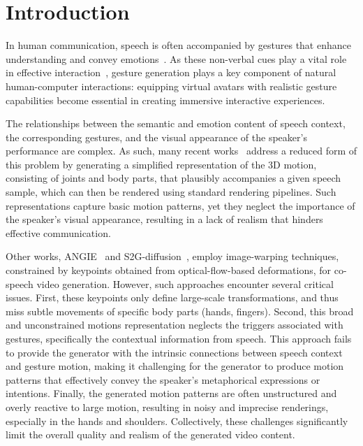 \section{Introduction}
\label{sec:introduction}
  \vspace{-0.1cm}

In human communication, speech is often accompanied by gestures that enhance understanding and convey emotions~\cite{de2012interplay}. As these non-verbal cues play a vital role in effective interaction~\cite{burgoon1990nonverbal}, gesture generation plays a key component of natural human-computer interactions: equipping virtual avatars with realistic gesture capabilities become essential in creating immersive interactive experiences.

The relationships between the semantic and emotion content of speech context, the corresponding gestures, and the visual appearance of the speaker's performance are complex. As such, many recent works~\cite{yi2022generating, liu2023emage, liu2022learning, liu2022disco} address a reduced form of this problem by generating a simplified representation of the 3D motion, consisting of joints and body parts, that plausibly accompanies a given speech sample, which can then be rendered using standard rendering pipelines. Such representations capture basic motion patterns, yet they neglect the importance of the speaker's visual appearance, resulting in a lack of realism that hinders effective communication.

Other works, \eg ANGIE~\cite{angie} and S2G-diffusion~\cite{s2gdiffusion}, employ image-warping techniques, constrained by keypoints obtained from optical-flow-based deformations, for co-speech video generation.
However, such approaches encounter several critical issues.
First, these keypoints only define large-scale transformations, and thus miss subtle movements of specific body parts (\eg hands, fingers).
Second, this broad and unconstrained motions representation neglects the triggers associated with gestures, specifically the contextual information from speech. This approach fails to provide the generator with the intrinsic connections between speech context and gesture motion, making it challenging for the generator to produce motion patterns that effectively convey the speaker's metaphorical expressions or intentions.
Finally, the generated motion patterns are often unstructured and overly reactive to large motion, resulting in noisy and imprecise renderings, especially in the hands and shoulders.
Collectively, these challenges significantly limit the overall quality and realism of the generated video content.


